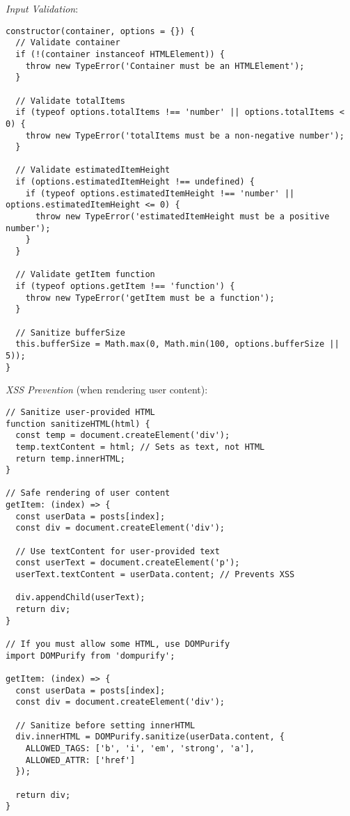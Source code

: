 \documentclass[11pt]{article}
\begin{document}
\emph{Input Validation}:

\begin{verbatim}
constructor(container, options = {}) {
  // Validate container
  if (!(container instanceof HTMLElement)) {
    throw new TypeError('Container must be an HTMLElement');
  }
  
  // Validate totalItems
  if (typeof options.totalItems !== 'number' || options.totalItems < 0) {
    throw new TypeError('totalItems must be a non-negative number');
  }
  
  // Validate estimatedItemHeight
  if (options.estimatedItemHeight !== undefined) {
    if (typeof options.estimatedItemHeight !== 'number' || options.estimatedItemHeight <= 0) {
      throw new TypeError('estimatedItemHeight must be a positive number');
    }
  }
  
  // Validate getItem function
  if (typeof options.getItem !== 'function') {
    throw new TypeError('getItem must be a function');
  }
  
  // Sanitize bufferSize
  this.bufferSize = Math.max(0, Math.min(100, options.bufferSize || 5));
}
\end{verbatim}

\emph{XSS Prevention} (when rendering user content):

\begin{verbatim}
// Sanitize user-provided HTML
function sanitizeHTML(html) {
  const temp = document.createElement('div');
  temp.textContent = html; // Sets as text, not HTML
  return temp.innerHTML;
}

// Safe rendering of user content
getItem: (index) => {
  const userData = posts[index];
  const div = document.createElement('div');
  
  // Use textContent for user-provided text
  const userText = document.createElement('p');
  userText.textContent = userData.content; // Prevents XSS
  
  div.appendChild(userText);
  return div;
}

// If you must allow some HTML, use DOMPurify
import DOMPurify from 'dompurify';

getItem: (index) => {
  const userData = posts[index];
  const div = document.createElement('div');
  
  // Sanitize before setting innerHTML
  div.innerHTML = DOMPurify.sanitize(userData.content, {
    ALLOWED_TAGS: ['b', 'i', 'em', 'strong', 'a'],
    ALLOWED_ATTR: ['href']
  });
  
  return div;
}
\end{verbatim}
\end{document}
